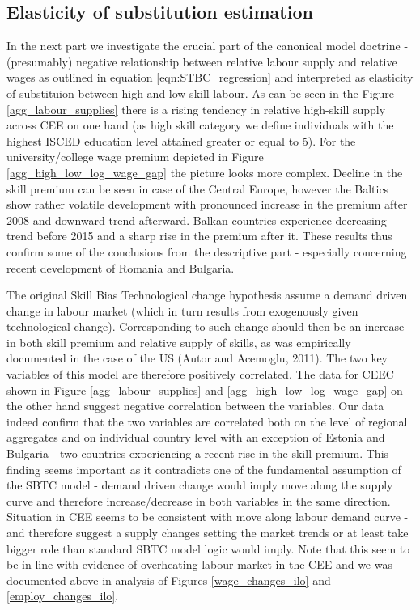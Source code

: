 \documentclass{article}
\begin{document}
\subsection{Elasticity of substitution estimation}
In the next part we investigate the crucial part of the canonical model doctrine - (presumably) negative relationship between relative labour supply and relative wages as outlined in equation \ref{eqn:STBC_regression} and interpreted as elasticity of substituion between high and low skill labour. As can be seen in the Figure \ref{agg_labour_supplies} there is a rising tendency in relative high-skill supply across CEE on one hand (as high skill category we define individuals with the highest ISCED education level attained greater or equal to 5). For the university/college wage premium depicted in Figure \ref{agg_high_low_log_wage_gap} the picture looks more complex. Decline in the skill premium can be seen in case of the Central Europe, however the Baltics show rather volatile development with pronounced increase in the premium after 2008 and downward trend afterward. Balkan countries experience decreasing trend before 2015 and a sharp rise in the premium after it. These results thus confirm some of the conclusions from the descriptive part - especially concerning recent development of Romania and Bulgaria.

The original Skill Bias Technological change hypothesis assume a demand driven change in labour market (which in turn results from exogenously given technological change). Corresponding to such change should then be an increase in both skill premium and relative supply of skills, as was empirically documented in the case of the US (Autor and Acemoglu, 2011). The two key variables of this model are therefore positively correlated. The data for CEEC shown in Figure \ref{agg_labour_supplies} and \ref{agg_high_low_log_wage_gap} on the other hand suggest negative correlation between the variables. 
Our data indeed confirm that the two variables are correlated both on the level of regional aggregates and on individual country level with an exception of Estonia and Bulgaria - two countries experiencing a recent rise in the skill premium. %
This finding seems important as it contradicts one of the fundamental assumption of the SBTC model - demand driven change would imply move along the supply curve and therefore increase/decrease in both variables in the same direction. Situation in CEE seems to be consistent with move along labour demand curve - and therefore suggest a supply changes setting the market trends or at least take bigger role than standard SBTC model logic would imply. Note that this seem to be in line with evidence of overheating labour market in the CEE and we was documented above in analysis of Figures \ref{wage_changes_ilo} and \ref{employ_changes_ilo}.
\end{document}
